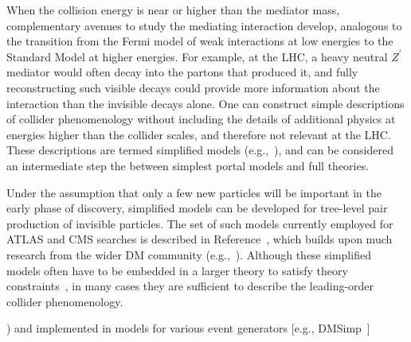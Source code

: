 \documentclass{ar-1col}
\newcommand{\IP}{invisible particle}
\newcommand{\Zprime}{\ensuremath{{Z}^\prime}\xspace}
\begin{document}
{When the collision energy is near or higher than the mediator
mass, complementary avenues to study the mediating interaction
develop, analogous to the transition from the Fermi model of weak
interactions at low energies to the Standard Model at higher
energies. For example, at the LHC, a heavy neutral \Zprime
mediator would often decay into the partons that produced it, and
fully reconstructing such visible decays could provide more
information about the interaction than the invisible decays alone.
One can construct simple descriptions of collider phenomenology without 
including the details of additional physics at energies higher than 
the collider scales, and therefore not relevant at the LHC.
These descriptions are termed simplified models
(e.g.,~),
and can be considered an intermediate step the between simplest portal
models and full theories. 

Under the assumption that only a few new particles
will be important in the early phase of discovery, 
simplified models can be developed for tree-level pair production of {\IP}s. The set of such models
currently employed for ATLAS and CMS searches is described in
Reference~, which builds upon much research from
the wider DM community
(e.g.,~). Although these simplified
models often have to be embedded in a larger theory to satisfy theory
constraints~\cite{Kahlhoefer:2015bea}, in many cases they are sufficient to
describe the leading-order collider phenomenology.

\begin{marginnote}[]
)
and implemented in models for various event generators [e.g.,
DMSimp~\cite{Backovic:2015soa}]
\end{marginnote}


}
\end{document}
